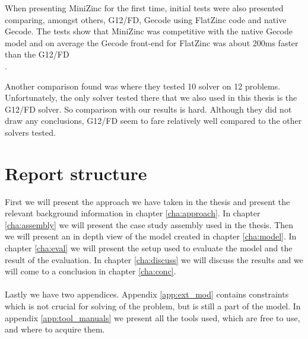 When presenting MiniZinc for the first time, initial tests were also presented comparing, amongst others, G12/FD, Gecode using FlatZinc code and native Gecode. The tests show that MiniZinc was competitive with the native Gecode model and on average the Gecode front-end for FlatZinc was about 200ms faster than the G12/FD\\\cite{mz_paper}.

Another comparison found was \cite{nicta_2964} where they tested 10 solver on 12 problems. Unfortunately, the only solver tested there that we also used in this thesis is the G12/FD solver. So comparison with our results is hard. Although they did not draw any conclusions, G12/FD seem to fare relatively well compared to the other solvers tested.


\section{Report structure}
First we will present the approach we have taken in the thesis and present the relevant background information in chapter \ref{cha:approach}. In chapter \ref{cha:assembly} we will present the case study assembly used in the thesis. Then we will present an in depth view of the model created in chapter \ref{cha:model}.  In chapter \ref{cha:eval} we will present the setup used to evaluate the model and the result of the evaluation. In chapter \ref{cha:discuss} we will discuss the results and we will come to a conclusion in chapter \ref{cha:conc}.
\\\\
Lastly we have two appendices. Appendix \ref{app:ext_mod} contains constraints which is not crucial for solving of the problem, but is still a part of the model. In appendix \ref{app:tool_manuals} we present all the tools used, which are free to use, and where to acquire them.

